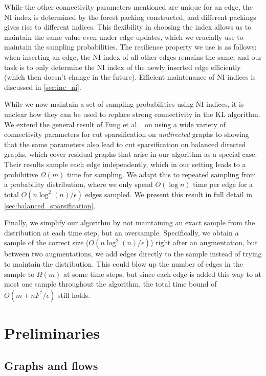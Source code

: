 \documentclass[11pt,a4paper]{article}
\newcommand{\tO}{\ensuremath{\widetilde O}}
\newcommand{\eps}{\epsilon}
\begin{document}
While the other connectivity parameters mentioned are unique for an edge, the NI index is determined by the forest packing constructed, and different packings gives rise to different indices. This flexibility in choosing the index allows us to maintain the same value even under edge updates, which we crucially use to maintain the sampling probabilities. The resilience property we use is as follows: when inserting an edge, the NI index of all other edges remains the same, and our task is to only determine the NI index of the newly inserted edge efficiently (which then doesn't change in the future). Efficient maintenance of NI indices is discussed in \cref{sec:inc_ni}.

While we now maintain a set of sampling probabilities using NI indices, it is unclear how they can be used to replace strong connectivity in the KL algorithm. We extend the general result of Fung et al.~\cite{FHHP19sparsification} on using a wide variety of connectivity parameters for cut sparsification on \emph{undirected} graphs to showing that the same parameters also lead to cut sparsification on balanced directed graphs, which cover residual graphs that arise in our algorithm as a special case. Their results sample each edge independently, which in our setting leads to a prohibitive $\Omega(m)$ time for sampling. We adapt this to repeated sampling from a probability distribution, where we only spend $O(\log n)$ time per edge for a total $O(n \log^2(n)/\eps)$ edges sampled. We present this result in full detail in \cref{sec:balanced_sparsification}.

Finally, we simplify our algorithm by not maintaining an exact sample from the distribution at each time step, but an oversample. Specifically, we obtain a sample of the correct size ($O(n \log^2 (n)/\eps)$) right after an augmentation, but between two augmentations, we add edges directly to the sample instead of trying to maintain the distribution. This could blow up the number of edges in the sample to $\Omega(m)$ at some time steps, but since each edge is added this way to at most one sample throughout the algorithm, the total time bound of $\tO(m + nF^*/\eps)$ still holds.

\section{Preliminaries}
\label{sec:prelim}

\subsection{Graphs and flows}
\label{sec:graphsflows}
\end{document}
